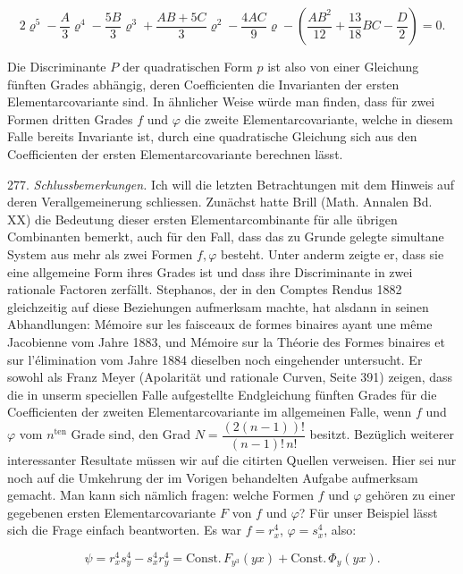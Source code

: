 
\[
2\varrho^5 - \frac{A}{3}\varrho^4 - \frac{5B}{3}\varrho^3 + \frac{AB+5C}{3}\varrho^2 - \frac{4AC}{9}\varrho - \left(\frac{AB^2}{12} + \frac{13}{18}BC - \frac{D}{2}\right) = 0.
\]

Die Discriminante $P$ der quadratischen Form $p$ ist also von einer Gleichung fünften Grades abhängig, deren Coefficienten die Invarianten der ersten Elementarcovariante sind. In ähnlicher Weise würde man finden, dass für zwei Formen dritten Grades $f$ und $\varphi$ die zweite Elementarcovariante, welche in diesem Falle bereits Invariante ist, durch eine quadratische Gleichung sich aus den Coefficienten der ersten Elementarcovariante berechnen lässt.

277. \textit{Schlussbemerkungen.} Ich will die letzten Betrachtungen mit dem Hinweis auf deren Verallgemeinerung schliessen. Zunächst hatte Brill (Math. Annalen Bd. XX) die Bedeutung dieser ersten Elementarcombinante für alle übrigen Combinanten bemerkt, auch für den Fall, dass das zu Grunde gelegte simultane System aus mehr als zwei Formen $f, \varphi$ besteht. Unter anderm zeigte er, dass sie eine allgemeine Form ihres Grades ist und dass ihre Discriminante in zwei rationale Factoren zerfällt. Stephanos, der in den Comptes Rendus 1882 gleichzeitig auf diese Beziehungen aufmerksam machte, hat alsdann in seinen Abhandlungen: \glqq Mémoire sur les faisceaux de formes binaires ayant une même Jacobienne\grqq{} vom Jahre 1883, und \glqq Mémoire sur la Théorie des Formes binaires et sur l'élimination\grqq{} vom Jahre 1884 dieselben noch eingehender untersucht. Er sowohl als Franz Meyer (Apolarität und rationale Curven, Seite 391) zeigen, dass die in unserm speciellen Falle aufgestellte Endgleichung fünften Grades für die Coefficienten der zweiten Elementarcovariante im allgemeinen Falle, wenn $f$ und $\varphi$ vom $n^{\text{ten}}$ Grade sind, den Grad $N = \dfrac{(2(n-1))!}{(n-1)!\,n!}$ besitzt. Bezüglich weiterer interessanter Resultate müssen wir auf die citirten Quellen verweisen. Hier sei nur noch auf die Umkehrung der im Vorigen behandelten Aufgabe aufmerksam gemacht. Man kann sich nämlich fragen: welche Formen $f$ und $\varphi$ gehören zu einer gegebenen ersten Elementarcovariante $F$ von $f$ und $\varphi$? Für unser Beispiel lässt sich die Frage einfach beantworten. Es war $f = r_x^4$, $\varphi = s_x^4$, also:

\[
\psi = r_x^4 s_y^4 - s_x^4 r_y^4 = \mathrm{Const.}\, F_{y^3}(yx) + \mathrm{Const.}\, \Phi_y(yx).
\]

